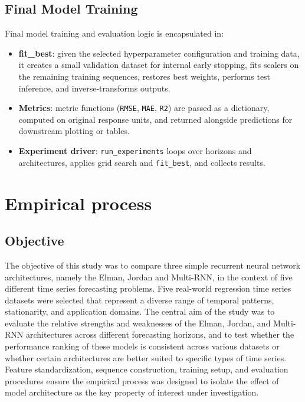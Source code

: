 \documentclass[conference]{IEEEtran}
\begin{document}
\subsection{\textbf{Final Model Training}}
Final model training and evaluation logic is encapsulated in:
\begin{itemize}
    \item \textbf{fit\_best}: given the selected hyperparameter configuration and training data, it creates a small validation dataset for internal early stopping, fits scalers on the remaining training sequences, restores best weights, performs test inference, and inverse-transforms outputs.
    \item \textbf{Metrics}: metric functions (\texttt{RMSE}, \texttt{MAE}, \texttt{R2}) are passed as a dictionary, computed on original response units, and returned alongside predictions for downstream plotting or tables.
    \item \textbf{Experiment driver}: \texttt{run\_experiments} loops over horizons and architectures, applies grid search and \texttt{fit\_best}, and collects results.
\end{itemize}

\section{\textbf{Empirical process}}

\subsection{\textbf{Objective}}
The objective of this study was to compare three simple recurrent neural network architectures, namely the Elman, Jordan and Multi-RNN, in the context of five different time series forecasting problems. Five real-world regression time series datasets were selected that represent a diverse range of temporal patterns, stationarity, and application domains.
The central aim of the study was to evaluate the relative strengths and weaknesses of the Elman, Jordan, and Multi-RNN architectures across different forecasting horizons, and to test whether the performance ranking of these models is consistent across various datasets or whether certain architectures are better suited to specific types of time series.
Feature standardization, sequence construction, training setup, and evaluation procedures ensure the empirical process was designed to isolate the effect of model architecture as the key property of interest under investigation.
\end{document}

